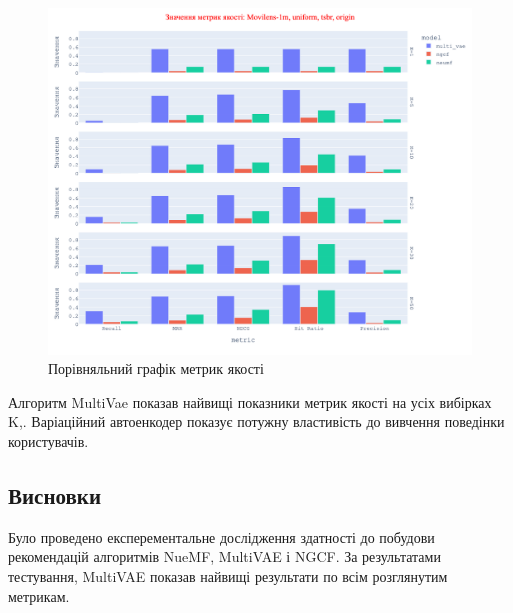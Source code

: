 \begin{figure}[H]
    \centering
    \includegraphics[width=1\textwidth]{images/experiments/metrics_exp_1.png}
    \caption{Порівняльний графік метрик якості}
\end{figure}

Алгоритм MultiVae  показав найвищі показники метрик якості на усіх вибірках K,. Варіаційний автоенкодер показує потужну властивість до вивчення поведінки користувачів.


\subsection*{Висновки}
Було проведено експерементальне дослідження здатності до побудови рекомендацій алгоритмів NueMF, MultiVAE і NGCF. За результатами тестування,  MultiVAE  показав найвищі результати по всім розглянутим метрикам.